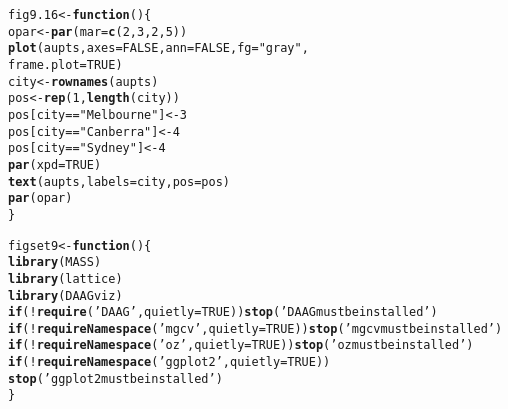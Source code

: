 \documentclass[12pt, a4paper,  BCOR=8.25mm, DIV=15]{scrartcl}\usepackage[]{graphicx}\usepackage[]{color}
\makeatletter
\newcommand{\hlnum}[1]{\textcolor[rgb]{0.686,0.059,0.569}{#1}}%
\newcommand{\hlstr}[1]{\textcolor[rgb]{0.192,0.494,0.8}{#1}}%
\newcommand{\hlopt}[1]{\textcolor[rgb]{0,0,0}{#1}}%
\newcommand{\hlstd}[1]{\textcolor[rgb]{0.345,0.345,0.345}{#1}}%
\newcommand{\hlkwa}[1]{\textcolor[rgb]{0.161,0.373,0.58}{\textbf{#1}}}%
\newcommand{\hlkwb}[1]{\textcolor[rgb]{0.69,0.353,0.396}{#1}}%
\newcommand{\hlkwc}[1]{\textcolor[rgb]{0.333,0.667,0.333}{#1}}%
\newcommand{\hlkwd}[1]{\textcolor[rgb]{0.737,0.353,0.396}{\textbf{#1}}}%
\newenvironment{kframe}{%
 \def\at@end@of@kframe{}%
 \ifinner\ifhmode%
  \def\at@end@of@kframe{\end{minipage}}%
  \begin{minipage}{\columnwidth}%
 \fi\fi%
 \def\FrameCommand##1{\hskip\@totalleftmargin \hskip-\fboxsep
 \colorbox{shadecolor}{##1}\hskip-\fboxsep
     \hskip-\linewidth \hskip-\@totalleftmargin \hskip\columnwidth}%
 \MakeFramed {\advance\hsize-\width
   \@totalleftmargin\z@ \linewidth\hsize
   \@setminipage}}%
 {\par\unskip\endMakeFramed%
 \at@end@of@kframe}
\newenvironment{knitrout}{}{} %
\makeatother
\begin{document}
\begin{knitrout}
\color{fgcolor}\begin{kframe}
\begin{alltt}
\hlstd{fig9.16} \hlkwb{<-} \hlkwa{function}\hlstd{()\{}
\hlstd{opar} \hlkwb{<-} \hlkwd{par}\hlstd{(}\hlkwc{mar}\hlstd{=}\hlkwd{c}\hlstd{(}\hlnum{2}\hlstd{,}\hlnum{3}\hlstd{,}\hlnum{2}\hlstd{,}\hlnum{5}\hlstd{))}
\hlkwd{plot}\hlstd{(aupts,} \hlkwc{axes}\hlstd{=}\hlnum{FALSE}\hlstd{,} \hlkwc{ann}\hlstd{=}\hlnum{FALSE}\hlstd{,} \hlkwc{fg}\hlstd{=}\hlstr{"gray"}\hlstd{,}
     \hlkwc{frame.plot}\hlstd{=}\hlnum{TRUE}\hlstd{)}
\hlstd{city} \hlkwb{<-} \hlkwd{rownames}\hlstd{(aupts)}
\hlstd{pos} \hlkwb{<-} \hlkwd{rep}\hlstd{(}\hlnum{1}\hlstd{,}\hlkwd{length}\hlstd{(city))}
\hlstd{pos[city}\hlopt{==}\hlstr{"Melbourne"}\hlstd{]}\hlkwb{<-} \hlnum{3}
\hlstd{pos[city}\hlopt{==}\hlstr{"Canberra"}\hlstd{]} \hlkwb{<-} \hlnum{4}
\hlstd{pos[city}\hlopt{==}\hlstr{"Sydney"}\hlstd{]} \hlkwb{<-} \hlnum{4}
\hlkwd{par}\hlstd{(}\hlkwc{xpd}\hlstd{=}\hlnum{TRUE}\hlstd{)}
\hlkwd{text}\hlstd{(aupts,} \hlkwc{labels}\hlstd{=city,} \hlkwc{pos}\hlstd{=pos)}
\hlkwd{par}\hlstd{(opar)}
\hlstd{\}}
\end{alltt}
\end{kframe}
\end{knitrout}



\newpage

\begin{knitrout}
\color{fgcolor}\begin{kframe}
\begin{alltt}
\hlstd{figset9} \hlkwb{<-} \hlkwa{function}\hlstd{()\{}
    \hlkwd{library}\hlstd{(MASS)}
    \hlkwd{library}\hlstd{(lattice)}
    \hlkwd{library}\hlstd{(DAAGviz)}
    \hlkwa{if}\hlstd{(}\hlopt{!}\hlkwd{require}\hlstd{(}\hlstr{'DAAG'}\hlstd{,} \hlkwc{quietly}\hlstd{=}\hlnum{TRUE}\hlstd{))}\hlkwd{stop}\hlstd{(}\hlstr{'DAAG must be installed'}\hlstd{)}
    \hlkwa{if}\hlstd{(}\hlopt{!}\hlkwd{requireNamespace}\hlstd{(}\hlstr{'mgcv'}\hlstd{,} \hlkwc{quietly}\hlstd{=}\hlnum{TRUE}\hlstd{))}\hlkwd{stop}\hlstd{(}\hlstr{'mgcv must be installed'}\hlstd{)}
    \hlkwa{if}\hlstd{(}\hlopt{!}\hlkwd{requireNamespace}\hlstd{(}\hlstr{'oz'}\hlstd{,} \hlkwc{quietly}\hlstd{=}\hlnum{TRUE}\hlstd{))}\hlkwd{stop}\hlstd{(}\hlstr{'oz must be installed'}\hlstd{)}
  \hlkwa{if}\hlstd{(}\hlopt{!}\hlkwd{requireNamespace}\hlstd{(}\hlstr{'ggplot2'}\hlstd{,} \hlkwc{quietly}\hlstd{=}\hlnum{TRUE}\hlstd{))}
    \hlkwd{stop}\hlstd{(}\hlstr{'ggplot2 must be installed'}\hlstd{)}
\hlstd{\}}
\end{alltt}
\end{kframe}
\end{knitrout}
\end{document}
